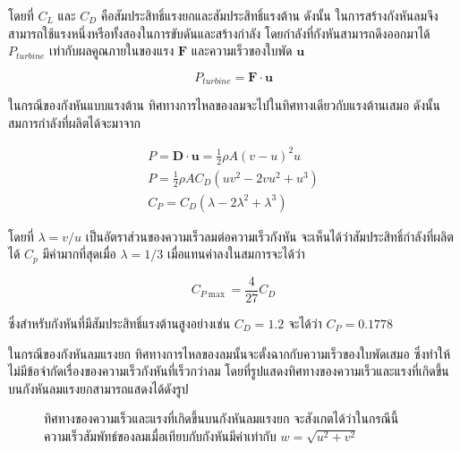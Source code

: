 \documentclass[11pt]{article}
\begin{document}
โดยที่ \(C_L\) และ \(C_D\) คือสัมประสิทธิ์แรงยกและสัมประสิทธิ์แรงต้าน ดังนั้น ในการสร้างกังหันลมจึงสามารถใช้แรงหนึ่งหรือทั้งสองในการขับดันและสร้างกำลัง โดยกำลังที่กังหันสามารถดึงออกมาได้ \(P_{turbine}\) เท่ากับผลคูณภายในของแรง \(\mathbf{F}\) และความเร็วของใบพัด \(\mathbf{u}\) 

\begin{equation}
  \label{eq:basic turbine power}
  P_{turbine} = \mathbf{F} \cdot \mathbf{u}
\end{equation}

ในกรณีของกังหันแบบแรงต้าน ทิศทางการไหลของลมจะไปในทิศทางเดียวกับแรงต้านเสมอ ดังนั้นสมการกำลังที่ผลิตได้จะมาจาก

\begin{gather}
  P = \mathbf{D} \cdot \mathbf{u} = \frac{1}{2} \rho A (v - u)^2 u \nonumber \\
  P = \frac{1}{2} \rho A C_D (uv^2 - 2vu^2 + u^3) \nonumber \\
  C_P = C_D \left( \lambda - 2\lambda^2 + \lambda^3 \right)
\end{gather}

โดยที่ \(\lambda = v / u\) เป็นอัตราส่วนของความเร็วลมต่อความเร็วกังหัน จะเห็นได้ว่าสัมประสิทธิ์กำลังที่ผลิตได้ \(C_p\) มีค่ามากที่สุดเมื่อ \(\lambda = 1/3\) เมื่อแทนค่าลงในสมการจะได้ว่า

\begin{equation}
  C_{P \max} = \dfrac{4}{27}C_D
  \label{eq:max power drag based}
\end{equation}

ซึ่งสำหรับกังหันที่มีสัมประสิทธิ์แรงต้านสูงอย่างเช่น \(C_D = 1.2\) จะได้ว่า \(C_P = 0.1778\)

ในกรณีของกังหันลมแรงยก ทิศทางการไหลของลมนั้นจะตั้งฉากกับความเร็วของใบพัดเสมอ ซึ่งทำให้ไม่มีข้อจำกัดเรื่องของความเร็วกังหันที่เร็วกว่าลม โดยที่รูปแสดงทิศทางของความเร็วและแรงที่เกิดขึ้นบนกังหันลมแรงยกสามารถแสดงได้ดังรูป

\begin{figure}[h]
  \centering
  \caption{ทิศทางของความเร็วและแรงที่เกิดขึ้นบนกังหันลมแรงยก จะสังเกตได้ว่าในกรณีนี้ ความเร็วสัมพัทธ์ของลมเมื่อเทียบกับกังหันมีค่าเท่ากับ $w = \sqrt{ u^2 + v^2}$}
  \label{fig:lift-based turbine}
\end{figure}
\end{document}
